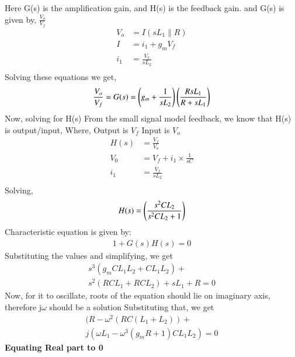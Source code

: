 \begin{enumerate}[label=\arabic*.,ref=\theenumi]
Here G(s) is the amplification gain, and H(s) is the feedback gain.\newline
and G(s) is given by, $\frac{V_o}{V_f}$
\begin{align}
    V_o &= I(sL_1\parallel R)\\
    I &= i_1 + g_mV_f\\
    i_1 &= \frac{V_\pi}{sL_2}\\
\end{align}
Solving these equations we get,\newline
\begin{align}
    \frac{V_o}{V_f} = G(s) = \left(g_m + \frac{1}{sL_2}\right)\left(\frac{RsL_1}{R + sL_1}\right)
\end{align}
Now, solving for H(s)\newline
From the small signal model feedback, we know that H(s) is output/input, \newline
Where,\newline
Output is $V_f$\newline
Input is $V_o$ \newline
\begin{align}
H(s) &= \frac{V_f}{V_o}\\
V_0 &= V_f + i_1\times \frac{1}{sC}\\
i_1 &= \frac{V_f}{sL_2}\\
\end{align}
Solving,\newline
\begin{align}
    H(s) = \left(\frac{s^2CL_2}{s^2CL_2 +1}\right)
\end{align}
Characteristic equation is given by:\newline
\begin{align}
    1+G(s)H(s) = 0
\end{align}
Substituting the values and simplifying, we get\newline
\begin{multline}
    s^3(g_mCL_1L_2 + CL_1L_2) +\\ s^2(RCL_1 + RCL_2) + sL_1 + R =0
\end{multline}
Now, for it to oscillate, roots of the equation should lie on imaginary axis, therefore j$\omega$ should be a solution\newline
Substituting that, we get
\begin{multline}
    (R - \omega^2(RC(L_1 +L_2)) +\\ j(\omega L_1 - \omega^3(g_mR +1)CL_1L_2) = 0
\end{multline}
\textbf{Equating Real part to 0}\newline

\end{enumerate}
